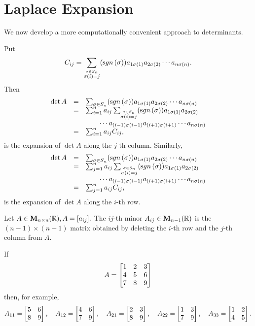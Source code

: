 \section{Laplace Expansion} We now develop a more
computationally convenient approach to determinants.

\bigskip
Put $$C_{ij} = \sum _{\stackrel{\sigma \in S_n}{\sigma (i) = j}}
(\sgn{\sigma})a_{1\sigma (1)}a_{2\sigma (2)}\cdots a_{n\sigma
(n)}. $$Then
\begin{equation}\label{eq:cofactor}\begin{array}{lll}\det A & = &
\sum _{\sigma \in S_n} (\sgn{\sigma})a_{1\sigma (1)}a_{2\sigma
(2)}\cdots a_{n\sigma (n)}
\\ &  = &   \sum _{i = 1} ^n a_{ij}\sum _{\stackrel{\sigma \in
S_n}{\sigma (i) = j}} (\sgn{\sigma})a_{1\sigma (1)}a_{2\sigma
(2)}\\ & &  \qquad \cdots a_{(i - 1)\sigma (i - 1)}a_{(i +
1)\sigma (i + 1)}\cdots a_{n\sigma (n)} \\& = &  \sum _{i = 1} ^n
a_{ij}C_{ij},
\end{array}\end{equation}is the expansion of $\det A$ along the $j$-th column.
Similarly,
$$\begin{array}{lll}\det A & = &  \sum _{\sigma \in S_n}
(\sgn{\sigma})a_{1\sigma (1)}a_{2\sigma (2)}\cdots a_{n\sigma (n)}
\\ & = &   \sum _{j = 1} ^n a_{ij}\sum _{\stackrel{\sigma \in
S_n}{\sigma (i) = j}} (\sgn{\sigma})a_{1\sigma (1)}a_{2\sigma
(2)}\\ & & \qquad \cdots a_{(i - 1)\sigma (i - 1)}a_{(i + 1)\sigma
(i + 1)}\cdots a_{n\sigma (n)}\\ & = & \sum _{j = 1} ^n
a_{ij}C_{ij},
\end{array}$$is the expansion of $\det A$ along the $i$-th row.
\begin{df}
Let $A\in{\mathbf M}_{n\times n}( \mathbb{R}), A = [a_{ij}]$. The $ij$-th minor
$A_{ij} \in{\mathbf M}_{n - 1}(\mathbb{R})$ is the $(n - 1)\times (n - 1)$  matrix
obtained by deleting the $i$-th row and the $j$-th column from $A$.
\end{df}
\begin{exa}
If $$ A = \begin{bmatrix} 1 & 2 & 3 \cr 4 & 5 & 6 \cr  7 & 8 & 9
\cr
\end{bmatrix}$$then, for example,  $$A_{11} =\begin{bmatrix} 5 & 6 \cr 8 & 9 \cr \end{bmatrix}, \
\ \ A_{12} = \begin{bmatrix} 4 & 6 \cr 7 & 9 \cr  \end{bmatrix}, \
\ \ A_{21} = \begin{bmatrix} 2 & 3 \cr 8 & 9 \cr  \end{bmatrix}, \
\ \ A_{22} = \begin{bmatrix} 1 & 3 \cr 7 & 9 \cr  \end{bmatrix}, \
\ \ A_{33} = \begin{bmatrix} 1 & 2 \cr 4 & 5 \cr  \end{bmatrix}.
$$
\end{exa}

